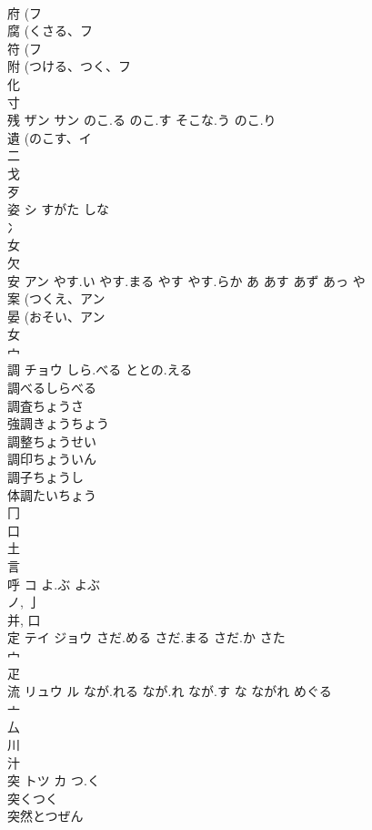 \documentclass[8pt]{extreport}
\begin{document}
\begin{CJK}{UTF8}{min}
\\	府 (フ 
\\	腐 (くさる、フ 
\\	符 (フ 
\\	附 (つける、つく、フ 
\\	化 
\\	寸 
\\	残	ザン サン	のこ.る のこ.す そこな.う のこ.り	
\\	遺 (のこす、イ 
\\	二 
\\	戈 
\\	歹 
\\	姿	シ	すがた しな	
\\	冫 
\\	女 
\\	欠 
\\	安	アン	やす.い やす.まる やす やす.らか あ あす あず あっ や	
\\	案 (つくえ、アン 
\\	晏 (おそい、アン 
\\	女 
\\	宀 
\\	調	チョウ	しら.べる ととの.える	
\\	調べるしらべる 
\\	調査ちょうさ 
\\	強調きょうちょう 
\\	調整ちょうせい 
\\	調印ちょういん 
\\	調子ちょうし 
\\	体調たいちょう 
\\	冂 
\\	口 
\\	土 
\\	言 
\\	呼	コ	よ.ぶ よぶ	
\\	ノ, 亅 
\\	并, 口 
\\	定	テイ ジョウ	さだ.める さだ.まる さだ.か さた	
\\	宀 
\\	疋 
\\	流	リュウ ル	なが.れる なが.れ なが.す な ながれ めぐる	
\\	亠 
\\	厶 
\\	川 
\\	汁 
\\	突	トツ カ	つ.く	
\\	突くつく 
\\	突然とつぜん 

\end{CJK}
\end{document}
